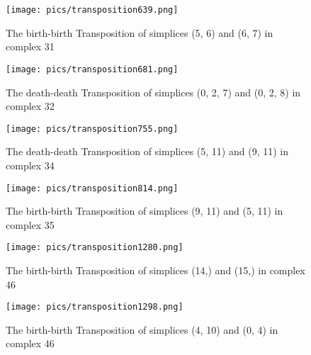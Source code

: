 \documentclass{article}
\begin{document}
\begin{figure}[ht]
\centering
\texttt{[image: pics/transposition639.png]}
\caption{The birth-birth Transposition of simplices (5, 6) and (6, 7) in complex 31}
\label{fig:unexpected639}
\end{figure}

\begin{figure}[ht]
\centering
\texttt{[image: pics/transposition681.png]}
\caption{The death-death Transposition of simplices (0, 2, 7) and (0, 2, 8) in complex 32}
\label{fig:unexpected681}
\end{figure}

\begin{figure}[ht]
\centering
\texttt{[image: pics/transposition755.png]}
\caption{The death-death Transposition of simplices (5, 11) and (9, 11) in complex 34}
\label{fig:unexpected755}
\end{figure}

\begin{figure}[ht]
\centering
\texttt{[image: pics/transposition814.png]}
\caption{The birth-birth Transposition of simplices (9, 11) and (5, 11) in complex 35}
\label{fig:unexpected814}
\end{figure}

\begin{figure}[ht]
\centering
\texttt{[image: pics/transposition1280.png]}
\caption{The birth-birth Transposition of simplices (14,) and (15,) in complex 46}
\label{fig:unexpected1280}
\end{figure}

\begin{figure}[ht]
\centering
\texttt{[image: pics/transposition1298.png]}
\caption{The birth-birth Transposition of simplices (4, 10) and (0, 4) in complex 46}
\label{fig:unexpected1298}
\end{figure}
\end{document}
